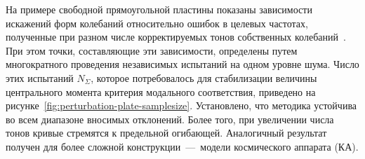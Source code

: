 На примере свободной прямоугольной пластины показаны зависимости искажений форм колебаний относительно ошибок в целевых частотах, полученные при разном числе корректируемых тонов собственных колебаний~. При этом точки, составляющие эти зависимости, определены путем многократного проведения независимых испытаний на одном уровне шума. Число этих испытаний $ N_\Sigma $, которое потребовалось для стабилизации величины центрального момента критерия модального соответствия, приведено на рисунке~\ref{fig:perturbation-plate-samplesize}. Установлено, что методика устойчива во всем диапазоне вносимых отклонений. Более того, при увеличении числа тонов кривые стремятся к предельной огибающей. Аналогичный результат получен для более сложной конструкции~---~модели космического аппарата (КА).

